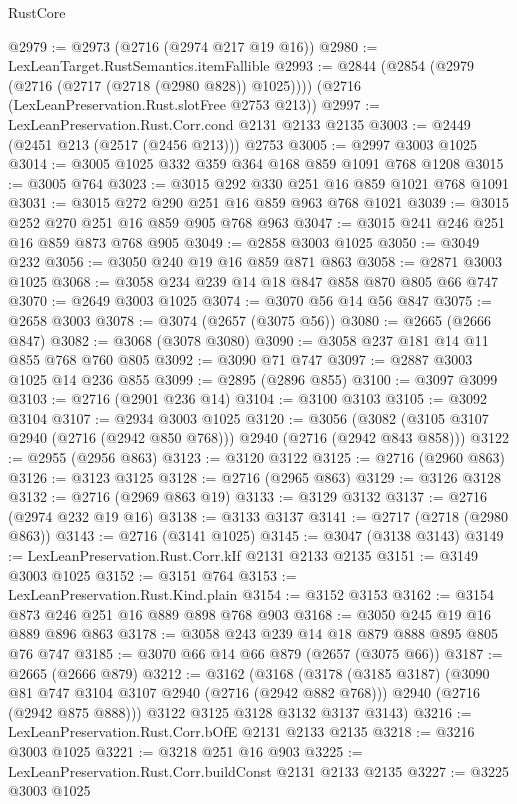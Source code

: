 \begin{lexlean}{RustCore}
\begin{coremodule}
@2979 := @2973 (@2716 (@2974 @217 @19 @16))
@2980 := LexLeanTarget.RustSemantics.itemFallible
@2993 := @2844
    (@2854 (@2979 (@2716 (@2717 (@2718 (@2980 @828)) @1025))))
    (@2716 (LexLeanPreservation.Rust.slotFree @2753 @213))
@2997 := LexLeanPreservation.Rust.Corr.cond @2131 @2133 @2135
@3003 := @2449 (@2451 @213 (@2517 (@2456 @213))) @2753
@3005 := @2997 @3003 @1025
@3014 := @3005 @1025 @332 @359 @364 @168 @859 @1091 @768 @1208
@3015 := @3005 @764
@3023 := @3015 @292 @330 @251 @16 @859 @1021 @768 @1091
@3031 := @3015 @272 @290 @251 @16 @859 @963 @768 @1021
@3039 := @3015 @252 @270 @251 @16 @859 @905 @768 @963
@3047 := @3015 @241 @246 @251 @16 @859 @873 @768 @905
@3049 := @2858 @3003 @1025
@3050 := @3049 @232
@3056 := @3050 @240 @19 @16 @859 @871 @863
@3058 := @2871 @3003 @1025
@3068 := @3058 @234 @239 @14 @18 @847 @858 @870 @805 @66 @747
@3070 := @2649 @3003 @1025
@3074 := @3070 @56 @14 @56 @847
@3075 := @2658 @3003
@3078 := @3074 (@2657 (@3075 @56))
@3080 := @2665 (@2666 @847)
@3082 := @3068 (@3078 @3080)
@3090 := @3058 @237 @181 @14 @11 @855 @768 @760 @805
@3092 := @3090 @71 @747
@3097 := @2887 @3003 @1025 @14 @236 @855
@3099 := @2895 (@2896 @855)
@3100 := @3097 @3099
@3103 := @2716 (@2901 @236 @14)
@3104 := @3100 @3103
@3105 := @3092 @3104
@3107 := @2934 @3003 @1025
@3120 := @3056 (@3082 (@3105 @3107 @2940 (@2716 (@2942 @850 @768))) @2940 (@2716 (@2942 @843 @858)))
@3122 := @2955 (@2956 @863)
@3123 := @3120 @3122
@3125 := @2716 (@2960 @863)
@3126 := @3123 @3125
@3128 := @2716 (@2965 @863)
@3129 := @3126 @3128
@3132 := @2716 (@2969 @863 @19)
@3133 := @3129 @3132
@3137 := @2716 (@2974 @232 @19 @16)
@3138 := @3133 @3137
@3141 := @2717 (@2718 (@2980 @863))
@3143 := @2716 (@3141 @1025)
@3145 := @3047 (@3138 @3143)
@3149 := LexLeanPreservation.Rust.Corr.kIf @2131 @2133 @2135
@3151 := @3149 @3003 @1025
@3152 := @3151 @764
@3153 := LexLeanPreservation.Rust.Kind.plain
@3154 := @3152 @3153
@3162 := @3154 @873 @246 @251 @16 @889 @898 @768 @903
@3168 := @3050 @245 @19 @16 @889 @896 @863
@3178 := @3058 @243 @239 @14 @18 @879 @888 @895 @805 @76 @747
@3185 := @3070 @66 @14 @66 @879 (@2657 (@3075 @66))
@3187 := @2665 (@2666 @879)
@3212 := @3162
    (@3168
      (@3178
        (@3185 @3187)
        (@3090 @81 @747 @3104 @3107 @2940 (@2716 (@2942 @882 @768)))
        @2940
        (@2716 (@2942 @875 @888)))
      @3122
      @3125
      @3128
      @3132
      @3137
      @3143)
@3216 := LexLeanPreservation.Rust.Corr.bOfE @2131 @2133 @2135
@3218 := @3216 @3003 @1025
@3221 := @3218 @251 @16 @903
@3225 := LexLeanPreservation.Rust.Corr.buildConst @2131 @2133 @2135
@3227 := @3225 @3003 @1025

\end{coremodule}
\end{lexlean}
